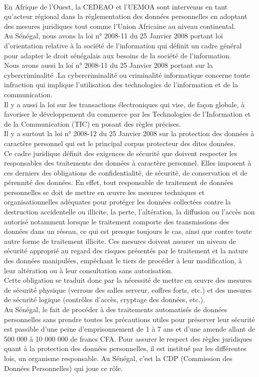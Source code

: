 \\En Afrique de l’Ouest, la CEDEAO et l’UEMOA  sont intervenus en tant qu’acteur régional dans la réglementation des données personnelles en adoptant des mesures juridiques tout comme l’Union Africaine au niveau continental. \\
Au Sénégal, nous avons la loi n° 2008-11 du 25 Janvier 2008 portant loi d’orientation relative à la société de l’information qui  définit un cadre général pour adapter le droit sénégalais aux besoins de la société de l’information. \\
Nous avons aussi la loi n° 2008-11 du 25 Janvier 2008 portant sur la cybercriminalité .La cybercriminalité ou criminalité informatique concerne toute infraction qui implique l’utilisation des technologies de l'information et de la communication. \\
Il y a aussi la loi sur les transactions électroniques qui vise, de façon globale, à favoriser le développement du commerce par les Technologies de l’Information et de la Communication (TIC) en posant des règles précises. \\
Il y a surtout la loi n° 2008-12 du 25 Janvier 2008 sur la protection des données à caractère personnel qui est le principal corpus protecteur des dites données.\\
Ce cadre juridique définit des exigences de sécurité que doivent respecter les responsables des traitements des données à caractère personnel. Elles imposent à ces derniers des obligations de confidentialité, de sécurité, de conservation et de pérennité des données. En effet, tout responsable de traitement de données personnelles se doit de mettre en œuvre les mesures techniques et organisationnelles adéquates pour protéger les données collectées contre la destruction accidentelle ou illicite, la perte, l’altération, la diffusion ou l’accès non autorisé notamment lorsque le traitement comporte des transmissions des données dans un réseau, ce qui est presque toujours le cas, ainsi que contre toute autre forme de traitement illicite. Ces mesures doivent assurer un niveau de sécurité approprié au regard des risques présentés par le traitement et la nature des données manipulées, empêchant le tiers de procéder à leur modification, à leur altération ou à leur consultation sans autorisation.\\
Cette obligation se traduit donc par la nécessité de mettre en œuvre des mesures de sécurité physique (verrous des salles serveur, coffres forts, etc.) et des mesures de sécurité logique (contrôles d’accès, cryptage des données, etc.).\\
Au Sénégal, le fait de procéder à des traitements automatisés de données personnelles sans prendre toutes les précautions utiles pour préserver leur sécurité est passible d’une peine d’emprisonnement de 1 à 7 ans et d’une amende allant de 500 000 à 10 000 000 de francs CFA.
Pour assurer le respect des règles juridiques quant à la protection des données personnelles, il est institué par les différentes lois, un organisme responsable. Au Sénégal, c’est la CDP (Commission des Données Personnelles)  qui joue ce rôle.

